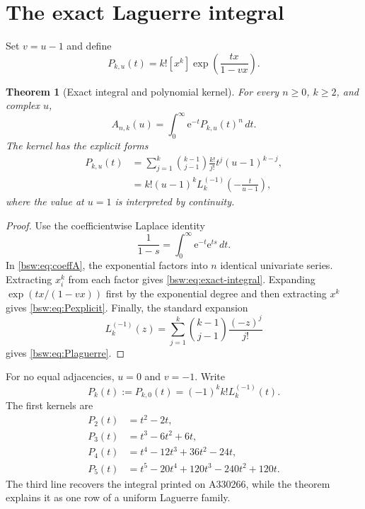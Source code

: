 \documentclass[11pt,letterpaper]{article}
\newtheorem{theorem}{Theorem}[section]
\theoremstyle{definition}
\theoremstyle{remark}
\newcommand{\ee}{\mathrm e}
\newcommand{\coef}[2]{[#1]#2}
\begin{document}
\section{The exact Laguerre integral}

Set $v=u-1$ and define
\begin{equation}\label{bsw:eq:Pku}
 P_{k,u}(t)=k!\coef{x^k}
 \exp\!\left(\frac{tx}{1-vx}\right).
\end{equation}

\begin{theorem}[Exact integral and polynomial kernel]\label{bsw:thm:integral}
For every $n\ge0$, $k\ge2$, and complex $u$,
\begin{equation}\label{bsw:eq:exact-integral}
 \boxed{\displaystyle
 A_{n,k}(u)=\int_0^\infty \ee^{-t}P_{k,u}(t)^n\,dt.}
\end{equation}
The kernel has the explicit forms
\begin{align}
 P_{k,u}(t)
 &=\sum_{j=1}^k \binom{k-1}{j-1}\frac{k!}{j!}
       t^j(u-1)^{k-j},\label{bsw:eq:Pexplicit}\\
 &=k!(u-1)^k L_k^{(-1)}\!\left(-\frac{t}{u-1}\right),
 \label{bsw:eq:Plaguerre}
\end{align}
where the value at $u=1$ is interpreted by continuity.
\end{theorem}

\begin{proof}
Use the coefficientwise Laplace identity
\[
 \frac1{1-s}=\int_0^\infty \ee^{-t}\ee^{ts}\,dt.
\]
In \eqref{bsw:eq:coeffA}, the exponential factors into $n$ identical univariate
series.  Extracting $x_i^k$ from each factor gives
\eqref{bsw:eq:exact-integral}.  Expanding
$\exp(tx/(1-vx))$ first by the exponential degree and then extracting $x^k$
gives \eqref{bsw:eq:Pexplicit}.  Finally, the standard
expansion~\cite{dlmf}
\[
 L_k^{(-1)}(z)=\sum_{j=1}^k
 \binom{k-1}{j-1}\frac{(-z)^j}{j!}
\]
gives \eqref{bsw:eq:Plaguerre}.
\end{proof}

For no equal adjacencies, $u=0$ and $v=-1$.  Write
\begin{equation}\label{bsw:eq:Pk}
 P_k(t):=P_{k,0}(t)=(-1)^k k!L_k^{(-1)}(t).
\end{equation}
The first kernels are
\begin{align*}
 P_2(t)&=t^2-2t,\\
 P_3(t)&=t^3-6t^2+6t,\\
 P_4(t)&=t^4-12t^3+36t^2-24t,\\
 P_5(t)&=t^5-20t^4+120t^3-240t^2+120t.
\end{align*}
The third line recovers the integral printed on A330266, while the theorem
explains it as one row of a uniform Laguerre family.
\end{document}
